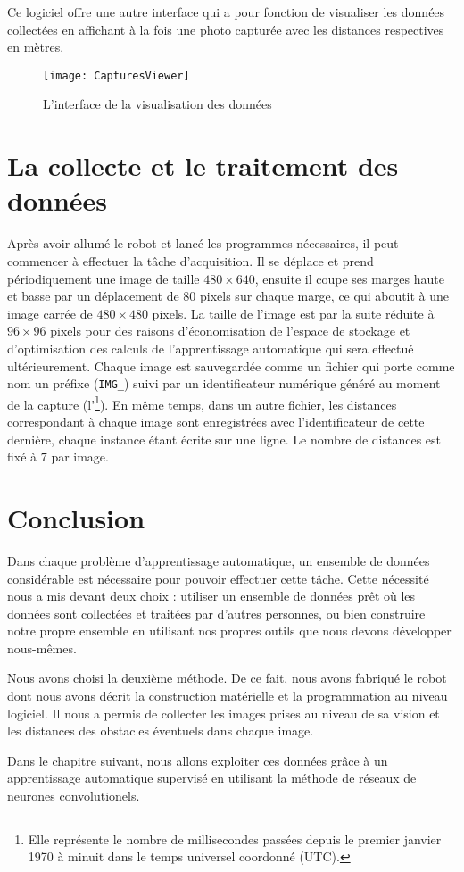 Ce logiciel offre une autre interface qui a pour fonction de visualiser les
données collectées en affichant à la fois une photo capturée avec les distances
respectives en mètres.

\begin{figure}[H]
\begin{center}
\texttt{[image: CapturesViewer]}
\caption{L'interface de la visualisation des données}
\end{center}
\end{figure}

\section{La collecte et le traitement des données}

Après avoir allumé le robot et lancé les programmes nécessaires, il peut commencer
à effectuer la tâche d'acquisition. Il se déplace et prend périodiquement une image
de taille $480 \times 640$, ensuite il coupe ses marges haute et basse par un
déplacement de $80$ pixels sur chaque marge, ce qui aboutit à une image carrée
de $480 \times 480$ pixels. La taille de l'image est par la suite réduite à
$96 \times 96$ pixels pour des raisons d'économisation de l'espace de stockage
et d'optimisation des calculs de l'apprentissage automatique qui sera effectué
ultérieurement. Chaque image est sauvegardée comme un fichier qui porte comme
nom un préfixe (\texttt{IMG\_}) suivi par un identificateur numérique généré
au moment de la capture (l'\footnote{Elle représente le nombre de
millisecondes passées depuis le premier janvier 1970 à minuit dans le temps
universel coordonné (UTC).}). En même temps, dans un autre fichier, les distances
correspondant à chaque image sont enregistrées avec l'identificateur de cette
dernière, chaque instance étant écrite sur une ligne. Le nombre de distances
est fixé à $7$ par image.

\section{Conclusion}

Dans chaque problème d'apprentissage automatique, un ensemble de données considérable
est nécessaire pour pouvoir effectuer cette tâche. Cette nécessité nous a mis devant
deux choix : utiliser un ensemble de données prêt où les données sont collectées
et traitées par d'autres personnes, ou bien construire notre propre ensemble en
utilisant nos propres outils que nous devons développer nous-mêmes.

Nous avons choisi la deuxième méthode. De ce fait, nous avons
fabriqué le robot dont nous avons décrit la construction matérielle et la
programmation au niveau logiciel. Il nous a permis de collecter les images
prises au niveau de sa vision et les distances des obstacles éventuels dans
chaque image.

Dans le chapitre suivant, nous allons exploiter ces données grâce à
un apprentissage automatique supervisé en utilisant la méthode de
réseaux de neurones convolutionels.

